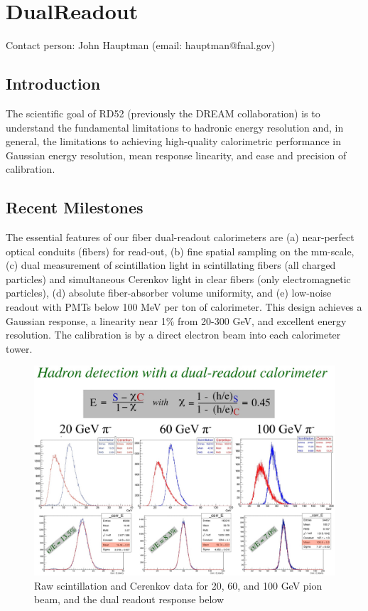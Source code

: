 \section{DualReadout}
Contact person: John Hauptman (email: hauptman@fnal.gov)
\subsection{Introduction}
The scientific goal of RD52 (previously the DREAM collaboration) is to understand the fundamental limitations to hadronic energy resolution and, in general, the limitations to achieving high-quality calorimetric performance in Gaussian energy resolution, mean response linearity, and ease and precision of calibration.
\subsection{Recent Milestones}
The essential features of our fiber dual-readout calorimeters are (a) near-perfect optical conduits (fibers) for read-out, (b) fine spatial sampling on the mm-scale, (c) dual measurement of scintillation light in scintillating fibers (all charged particles) and simultaneous Cerenkov light in clear fibers (only electromagnetic particles), (d) absolute fiber-absorber volume uniformity, and (e) low-noise readout with PMTs below 100 MeV per ton of calorimeter. This design achieves a Gaussian response, a linearity near 1\% from 20-300 GeV, and excellent energy resolution. The calibration is by a direct electron beam into each calorimeter tower.
\begin{figure}
\centering
\includegraphics[width=\linewidth]{Calorimeter/DualReadout/Res-pion-20-60-100GeV.jpg}
\caption{Raw scintillation and Cerenkov data for 20, 60, and 100 GeV pion beam, and the dual readout response below}
\label{fig:DualReadout:PionResponse}
\end{figure}

